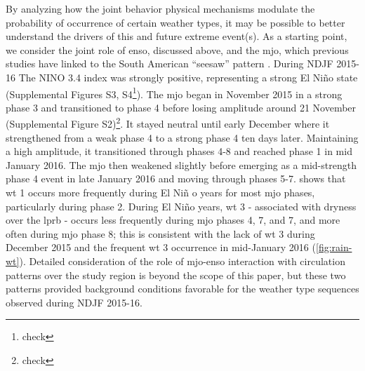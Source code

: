\documentclass[twocol]{ametsoc}
\begin{document}
By analyzing how the joint behavior physical mechanisms modulate the probability of occurrence of certain weather types, it may be possible to better understand the drivers of this and future extreme event(s).
As a starting point, we consider the joint role of \gls{enso}, discussed above, and the \gls{mjo}, which  previous studies have linked to the South American ``seesaw'' pattern \citep{Nogues-Paegle1997,Paegle2000,Liebmann2004}.
During NDJF 2015-16 The NINO 3.4 index was strongly positive, representing a strong El Ni\~{n}o state (Supplemental Figures S3, S4\footnote{check}).
The \gls{mjo} began in November 2015 in a strong phase 3 and transitioned to phase 4 before losing amplitude around 21 November (Supplemental Figure S2)\footnote{check}.
It stayed neutral until early December where it strengthened from a weak phase 4 to a strong phase 4 ten days later.
Maintaining a high amplitude, it transitioned through phases 4-8 and reached phase 1 in mid January 2016.
The \gls{mjo} then weakened slightly before emerging as a mid-strength phase 4 event in late January 2016 and moving through phases 5-7.
 shows that \gls{wt} 1 occurs more frequently during El Ni\~{n} o years for most \gls{mjo} phases, particularly during phase 2.
During El Ni\~no years, \gls{wt} 3 - associated with dryness over the \gls{lprb} - occurs less frequently during \gls{mjo} phases 4, 7, and 7, and more often during \gls{mjo} phase 8; this is consistent with the lack of \gls{wt} 3 during December 2015 and the frequent \gls{wt} 3 occurrence in mid-January 2016 (\cref{fig:rain-wt}).
Detailed consideration of the role of \gls{mjo}-\gls{enso} interaction with circulation patterns over the study region is beyond the scope of this paper, but these two patterns provided background conditions favorable for the weather type sequences observed during NDJF 2015-16.
\end{document}
